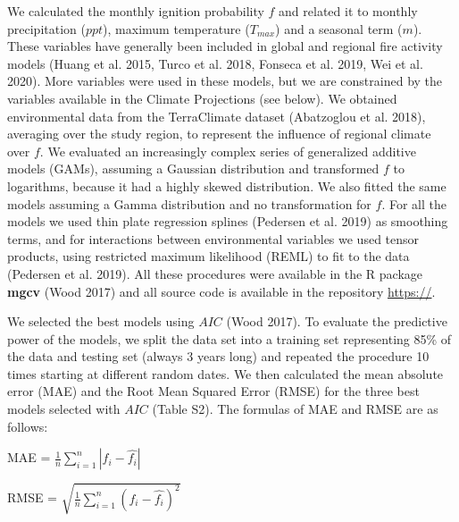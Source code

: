 \documentclass[
]{article}
\begin{document}
We calculated the monthly ignition probability \(f\) and related it to
monthly precipitation (\(ppt\)), maximum temperature (\(T_{max}\)) and a
seasonal term (\(m\)). These variables have generally been included in
global and regional fire activity models (Huang et al. 2015, Turco et
al. 2018, Fonseca et al. 2019, Wei et al. 2020). More variables were
used in these models, but we are constrained by the variables available
in the Climate Projections (see below). We obtained environmental data
from the TerraClimate dataset (Abatzoglou et al. 2018), averaging over
the study region, to represent the influence of regional climate over
\(f\). We evaluated an increasingly complex series of generalized
additive models (GAMs), assuming a Gaussian distribution and transformed
\(f\) to logarithms, because it had a highly skewed distribution. We
also fitted the same models assuming a Gamma distribution and no
transformation for \(f\). For all the models we used thin plate
regression splines (Pedersen et al. 2019) as smoothing terms, and for
interactions between environmental variables we used tensor products,
using restricted maximum likelihood (REML) to ﬁt to the data (Pedersen
et al. 2019). All these procedures were available in the R package
\textbf{mgcv} (Wood 2017) and all source code is available in the
repository \url{https://}.

We selected the best models using \(AIC\) (Wood 2017). To evaluate the
predictive power of the models, we split the data set into a training
set representing 85\% of the data and testing set (always 3 years long)
and repeated the procedure 10 times starting at different random dates.
We then calculated the mean absolute error (MAE) and the Root Mean
Squared Error (RMSE) for the three best models selected with \(AIC\)
(Table S2). The formulas of MAE and RMSE are as follows:

MAE = \(\frac{1}{n} \sum_{i=1}^n |f_i - \hat{f_i}|\)

RMSE = \(\sqrt{\frac{1}{n} \sum_{i=1}^n (f_i - \hat{f_i})^2}\)
\end{document}

